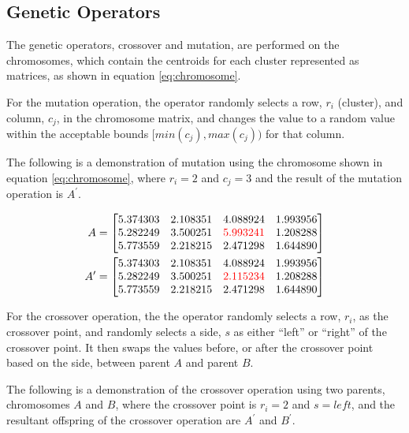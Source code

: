 \documentclass{article}
\begin{document}
\subsection{Genetic Operators}

The genetic operators, crossover and mutation, are performed on the chromosomes, which contain the centroids for each cluster represented as matrices, as shown in equation \ref{eq:chromosome}.

For the mutation operation, the operator randomly selects a row, $r_i$ (cluster), and column, $c_j$, in the chromosome matrix, and changes the value to a random value within the acceptable bounds $[min(c_j), max(c_j))$ for that column.

The following is a demonstration of mutation using the chromosome shown in equation \ref{eq:chromosome}, where $r_i = 2$ and  $c_j = 3$ and the result of the mutation operation is $A^{\prime}$.


\begin{align*}
A &= \begin{bmatrix}
    5.374303   & 2.108351   & 4.088924   & 1.993956 \\
    5.282249   & 3.500251   & \color{red}5.993241   & 1.208288 \\
    5.773559   & 2.218215   & 2.471298   & 1.644890 
    \end{bmatrix}\\
A^{\prime} &= \begin{bmatrix}
    5.374303   & 2.108351   & 4.088924   & 1.993956 \\
    5.282249   & 3.500251   & \color{red}2.115234   & 1.208288 \\
    5.773559   & 2.218215   & 2.471298   & 1.644890 
    \end{bmatrix}
\label{eq:mutation}
\end{align*}


For the crossover operation, the the operator randomly selects a row, $r_i$,  as the crossover point, and randomly selects a side, $s$ as either ``left'' or ``right'' of the crossover point. It then swaps the values before, or after the crossover point based on the side, between parent $A$ and parent $B$.

The following is a demonstration of the crossover operation using two parents, chromosomes $A$ and $B$, where the crossover point is $r_i = 2$ and $s = left$, and the resultant offspring of the crossover operation are $A^{\prime}$ and $B^{\prime}$.
\end{document}
